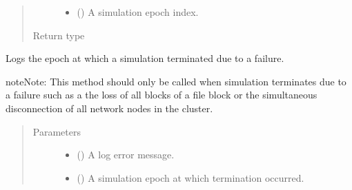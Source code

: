 \documentclass[letterpaper,10pt,english]{sphinxmanual}
\begin{document}
\begin{fulllineitems}
\begin{fulllineitems}
\begin{quote}
\begin{description}
\begin{itemize}
\item {} 
 () \textendash{} A simulation epoch index.

\end{itemize}

\item[{Return type}] \leavevmode
{}

\end{description}\end{quote}

\end{fulllineitems}


\begin{fulllineitems}
\label{\detokenize{app.domain.helpers:app.domain.helpers.smart_dataclasses.LoggingData.log_fail}}
Logs the epoch at which a simulation terminated due to a failure.

\begin{sphinxadmonition}{note}{Note:}
This method should only be called when simulation terminates due
to a failure such as a the loss of all blocks of a file block
or the simultaneous disconnection of all network nodes in the cluster.
\end{sphinxadmonition}
\begin{quote}\begin{description}
\item[{Parameters}] \leavevmode\begin{itemize}
\item {} 
 () \textendash{} A log error message.

\item {} 
 () \textendash{} A simulation epoch at which termination occurred.


\end{itemize}
\end{description}
\end{quote}
\end{fulllineitems}
\end{fulllineitems}
\end{document}
